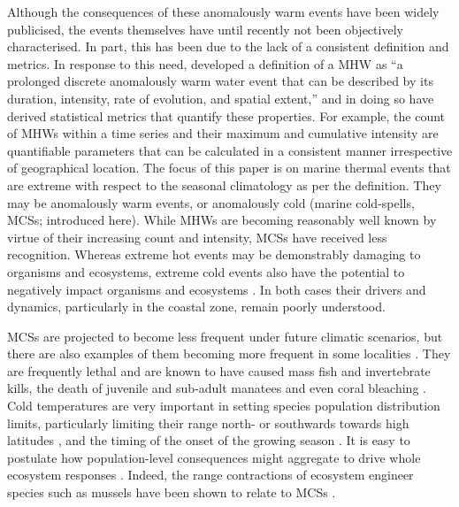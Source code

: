 \documentclass[a4paper,10pt,review]{elsarticle}
\begin{document}
Although the consequences of these anomalously warm events have been widely publicised, the events themselves have until recently not been objectively characterised. In part, this has been due to the lack of a consistent definition and metrics. In response to this need, \citet{Hobday2016} developed a definition of a MHW as ``a prolonged discrete anomalously warm water event that can be described by its duration, intensity, rate of evolution, and spatial extent,'' and in doing so have derived statistical metrics that quantify these properties. For example, the count of MHWs within a time series and their maximum and cumulative intensity are quantifiable parameters that can be calculated in a consistent manner irrespective of geographical location. The focus of this paper is on marine thermal events that are extreme with respect to the seasonal climatology as per the \citet{Hobday2016} definition. They may be anomalously warm events, or anomalously cold (marine cold-spells, MCSs; introduced here). While MHWs are becoming reasonably well known by virtue of their increasing count and intensity, MCSs have received less recognition. Whereas extreme hot events may be demonstrably damaging to organisms and ecosystems, extreme cold events also have the potential to negatively impact organisms and ecosystems \citep{Lirman2011}. In both cases their drivers and dynamics, particularly in the coastal zone, remain poorly understood.

MCSs are projected to become less frequent under future climatic scenarios, but there are also examples of them becoming more frequent in some localities \citep[e.g.][]{Gershunov2008, Matthes2015}. They are frequently lethal \citep{Woodward1987} and are known to have caused mass fish \citep{Gunter1941, Gunter1951, Holt1983} and invertebrate \citep{Gunter1951, Crisp1964} kills, the death of juvenile and sub-adult manatees \citep{OShea1985, Marsh1986} and even coral bleaching \citep{Lirman2011}. Cold temperatures are very important in setting species population distribution limits, particularly limiting their range north- or southwards towards high latitudes \citep{Firth2011}, and the timing of the onset of the growing season \citep{Jentsch2007}. It is easy to postulate how population-level consequences might aggregate to drive whole ecosystem responses \citep[e.g.][]{Kreyling2008, Rehage2016}. Indeed, the range contractions of ecosystem engineer species such as mussels have been shown to relate to MCSs \citep{Firth2011, Firth2015}.
\end{document}
